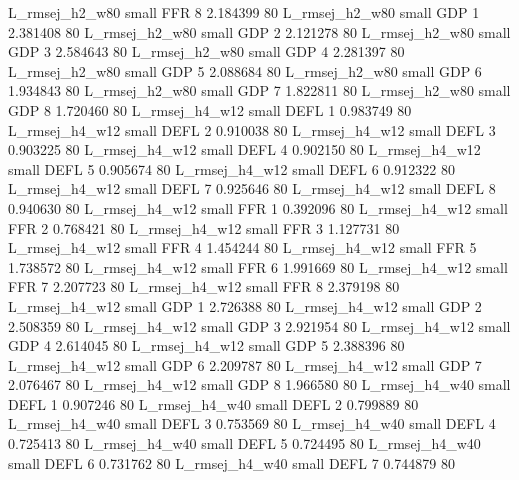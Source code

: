 L_rmsej_h2_w80      small      FFR                 8 2.184399 80
L_rmsej_h2_w80      small      GDP                 1 2.381408 80
L_rmsej_h2_w80      small      GDP                 2 2.121278 80
L_rmsej_h2_w80      small      GDP                 3 2.584643 80
L_rmsej_h2_w80      small      GDP                 4 2.281397 80
L_rmsej_h2_w80      small      GDP                 5 2.088684 80
L_rmsej_h2_w80      small      GDP                 6 1.934843 80
L_rmsej_h2_w80      small      GDP                 7 1.822811 80
L_rmsej_h2_w80      small      GDP                 8 1.720460 80
L_rmsej_h4_w12      small     DEFL                 1 0.983749 80
L_rmsej_h4_w12      small     DEFL                 2 0.910038 80
L_rmsej_h4_w12      small     DEFL                 3 0.903225 80
L_rmsej_h4_w12      small     DEFL                 4 0.902150 80
L_rmsej_h4_w12      small     DEFL                 5 0.905674 80
L_rmsej_h4_w12      small     DEFL                 6 0.912322 80
L_rmsej_h4_w12      small     DEFL                 7 0.925646 80
L_rmsej_h4_w12      small     DEFL                 8 0.940630 80
L_rmsej_h4_w12      small      FFR                 1 0.392096 80
L_rmsej_h4_w12      small      FFR                 2 0.768421 80
L_rmsej_h4_w12      small      FFR                 3 1.127731 80
L_rmsej_h4_w12      small      FFR                 4 1.454244 80
L_rmsej_h4_w12      small      FFR                 5 1.738572 80
L_rmsej_h4_w12      small      FFR                 6 1.991669 80
L_rmsej_h4_w12      small      FFR                 7 2.207723 80
L_rmsej_h4_w12      small      FFR                 8 2.379198 80
L_rmsej_h4_w12      small      GDP                 1 2.726388 80
L_rmsej_h4_w12      small      GDP                 2 2.508359 80
L_rmsej_h4_w12      small      GDP                 3 2.921954 80
L_rmsej_h4_w12      small      GDP                 4 2.614045 80
L_rmsej_h4_w12      small      GDP                 5 2.388396 80
L_rmsej_h4_w12      small      GDP                 6 2.209787 80
L_rmsej_h4_w12      small      GDP                 7 2.076467 80
L_rmsej_h4_w12      small      GDP                 8 1.966580 80
L_rmsej_h4_w40      small     DEFL                 1 0.907246 80
L_rmsej_h4_w40      small     DEFL                 2 0.799889 80
L_rmsej_h4_w40      small     DEFL                 3 0.753569 80
L_rmsej_h4_w40      small     DEFL                 4 0.725413 80
L_rmsej_h4_w40      small     DEFL                 5 0.724495 80
L_rmsej_h4_w40      small     DEFL                 6 0.731762 80
L_rmsej_h4_w40      small     DEFL                 7 0.744879 80
